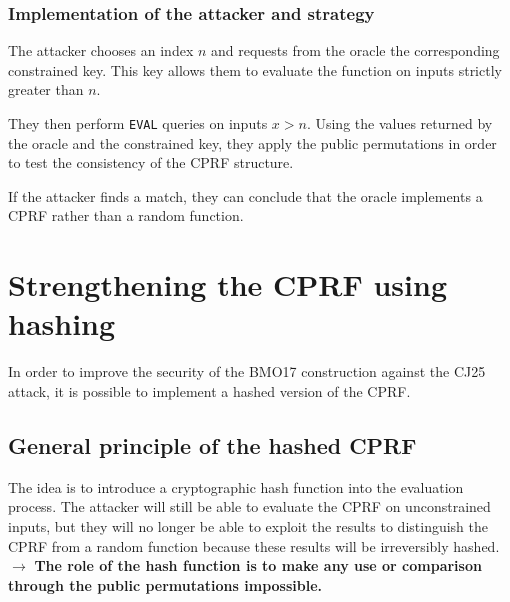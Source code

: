 \documentclass[9pt]{extarticle}
\begin{document}
\subsubsection{Implementation of the attacker and strategy}

The attacker chooses an index $n$ and requests from the oracle the corresponding constrained
key. This key allows them to evaluate the function on inputs
strictly greater than $n$.

They then perform \texttt{EVAL} queries on inputs
$x > n$. Using the values returned by the oracle and the constrained key, they
apply the public permutations in order to test the consistency of the CPRF structure.

If the attacker finds a match, they can conclude that the oracle implements a CPRF rather than a random function.

\section{Strengthening the CPRF using hashing}

In order to improve the security of the BMO17 construction against the CJ25 attack,
it is possible to implement a hashed version of the CPRF.

\subsection{General principle of the hashed CPRF}

The idea is to introduce a cryptographic hash function into the evaluation process. 
The attacker will still be able to evaluate the CPRF on unconstrained inputs, 
but they will no longer be able to exploit the results to distinguish the CPRF from a random function
because these results will be irreversibly hashed.\\

$\rightarrow$ \textbf{The role of the hash function is to make any use or comparison
through the public permutations impossible.}

\begin{center}
\end{center}
\end{document}
